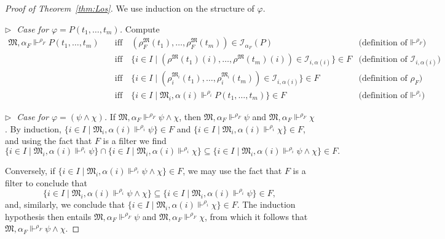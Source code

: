 \documentclass[10pt,a4paper]{amsart}
\newcommand{\II}{\mathscr{I}}
\newcommand{\mo}{\mathfrak}
\newcommand{\satisfySym}{\Vdash}
\newcommand{\satisfy}[4]{#1, #2 \satisfySym^{#4} #3}
\renewcommand{\iff}{\quad\text{iff}\quad}
\renewcommand{\phi}{\varphi}
\begin{document}
\begin{proof}[Proof of Theorem~\ref{thm:Los}]
  We use induction on the structure of $\phi$.

  \medskip\noindent
  \textit{$\triangleright\;$ Case for $\phi = P(t_1, \ldots, t_m)$.}
    Compute
    \begin{align*}
      \satisfy{\mo{M}}{\alpha_F}{P(t_1, \ldots, t_m)}{\rho_F}
        &\iff (\rho^{\mo{M}}_F(t_1), \ldots, \rho^{\mo{M}}_F(t_m)) \in \II_{\alpha_F}(P)
        &\text{(definition of $\satisfySym^{\rho_F}$)} \\
        &\iff \{ i \in I \mid (\rho^{\mo{M}}(t_1)(i), \ldots, \rho^{\mo{M}}(t_m)(i)) \in \II_{i, \alpha(i)} \} \in F 
        &\text{(definition of $\II_{i, \alpha(i)}$)} \\
        &\iff \{ i \in I \mid (\rho^{\mo{M}_i}_i(t_1), \ldots, \rho^{\mo{M}_i}_i(t_m)) \in \II_{i, \alpha(i)} \} \in F
        &\text{(definition of $\rho_F$)} \\
        &\iff \{ i \in I \mid \satisfy{\mo{M}_i}{\alpha(i)}{P(t_1, \ldots, t_m)}{\rho_i} \} \in F
        &\text{(definition of $\satisfySym^{\rho_i}$)}
    \end{align*}

  \medskip\noindent
  \textit{$\triangleright\;$ Case for $\phi = (\psi \wedge \chi)$.}
    If $\satisfy{\mo{M}}{\alpha_F}{\psi \wedge \chi}{\rho_F}$,
    then $\satisfy{\mo{M}}{\alpha_F}{\psi}{\rho_F}$ and
    $\satisfy{\mo{M}}{\alpha_F}{\chi}{\rho_F}$.
    By induction, $\{ i \in I \mid \satisfy{\mo{M}_i}{\alpha(i)}{\psi}{\rho_i} \} \in F$
    and $\{ i \in I \mid \satisfy{\mo{M}_i}{\alpha(i)}{\chi}{\rho_i} \} \in F$,
    and using the fact that $F$ is a filter we find
    \begin{equation*}
      \{ i \in I \mid \satisfy{\mo{M}_i}{\alpha(i)}{\psi}{\rho_i} \}
        \cap \{ i \in I \mid \satisfy{\mo{M}_i}{\alpha(i)}{\chi}{\rho_i} \}
        \subseteq \{ i \in I \mid \satisfy{\mo{M}_i}{\alpha(i)}{\psi \wedge \chi}{\rho_i} \} \in F.
    \end{equation*}
    
    Conversely, if $\{ i \in I \mid \satisfy{\mo{M}_i}{\alpha(i)}{\psi \wedge \chi}{\rho_i} \}\in F$,
    we may use the fact that $F$ is a filter to conclude that
    \begin{equation*}
      \{ i \in I \mid \satisfy{\mo{M}_i}{\alpha(i)}{\psi \wedge \chi}{\rho_i} \}
        \subseteq \{ i \in I \mid \satisfy{\mo{M}_i}{\alpha(i)}{\psi}{\rho_i} \} \in F,
    \end{equation*}
    and, similarly, we conclude that $\{ i \in I \mid \satisfy{\mo{M}_i}{\alpha(i)}{\chi}{\rho_i} \} \in F$.
    The induction hypothesis then entails $\satisfy{\mo{M}}{\alpha_F}{\psi}{\rho_F}$ and
    $\satisfy{\mo{M}}{\alpha_F}{\chi}{\rho_F}$, from which it follows that
    $\satisfy{\mo{M}}{\alpha_F}{\psi \wedge \chi}{\rho_F}$.


\end{proof}
\end{document}
